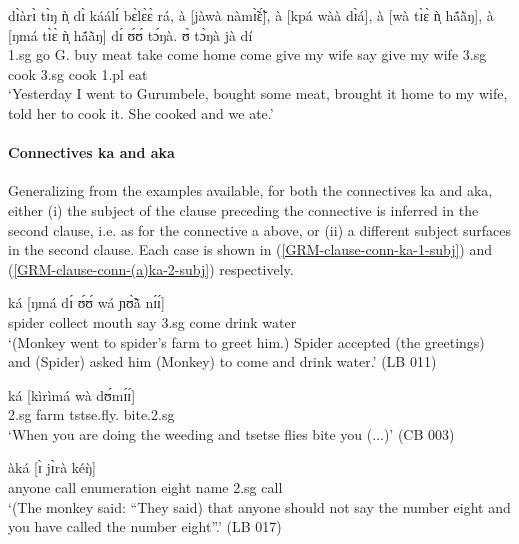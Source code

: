 \ea\label{ex:GRM-coor-vp8.1}
\gll dɪ̀àrɪ̀ tɪ̀ŋ ǹ̩ dɪ̀ káálɪ́ bɛ̀lɛ̀ɛ̀ rá, à [jàwà nàmɪ̃̀ɛ̃́], à 
[kpá wàà dɪ̀á], à  [wà tɪ̀ɛ̀ ǹ̩ hã́ã̀ŋ], à [ŋmá tɪ̀ɛ̀ ǹ̩ hã́ã̀ŋ] 
dɪ́ ʊ́ʊ́ tɔ́ŋà. ʊ̀ tɔ̀ŋà jà dí\\ 
{\advt} {\art} {\sc 1.sg} {\hest} {go} {G.}  {\foc} {\conn}   buy meat
{\conn}  take come home {\conn}  come give my wife  {\conn}  say give my wife
{\comp}  {\sc 3.sg}   {cook} {\sc 3.sg}   {cook}  {\sc 1.pl} {eat}\\
\glt  `Yesterday I went to Gurumbele,  bought some meat, brought it
home to my wife, told her to cook it. She cooked and we ate.'
\z


\paragraph{Connectives {\sls ka} and {\sls aka}}
\label{GRM-clause-coord-ka-aka}

Generalizing from the examples available, for both the connectives {\sls ka} 
and 
{\sls aka}, either (i) the subject of the clause preceding the connective is 
inferred in the second clause, i.e. as for  the connective  {\sls a} above, or 
(ii) a different subject surfaces in the second clause. Each case is shown in 
(\ref{GRM-clause-conn-ka-1-subj}) and (\ref{GRM-clause-conn-(a)ka-2-subj}) 
respectively.   


\ea\label{GRM-clause-conn-ka-1-subj} 
 ká  [ŋmá dɪ́ ʊ́ʊ́  
wá  
ɲʊ̃̀ã̀ nɪ́ɪ́]\\
spider collect mouth {\postp}  {\conn} say {\comp}  
{\sc 3.sg}  come   drink water\\
\glt  `(Monkey went to spider's farm to greet him.) Spider accepted
(the
greetings) and (Spider) asked him (Monkey) to come and drink water.'  (LB 011)
 \z



\ea\label{GRM-clause-conn-(a)ka-2-subj} 

\ea\label{GRM-clause-conn-ka-2-subj} 
\gll  [dɪ̀  ɪ̀    wáà    párà]  ká [kìrìmá  wà 
dʊ́mɪ́ɪ́]\\
{\conn} {\sc 2.sg} {\ingr}  farm {\conn} 
tstse.fly.{\pl}  {\ingr}  bite.{\sc 2.sg}\\
\glt  `When  you are doing the weeding and  tsetse flies bite
you (...)' (CB 003) 

\ex\label{GRM-clause-conn-aka-2-subj} 
 àká [ɪ̀ jɪ̀rà   kéŋ̀]\\
{\comp}   anyone     {\neg}   {\itr} {\ingr}  
   call   enumeration    
eight name   {\conn}   {\sc 2.sg}   call  {\advm}\\
\glt  `(The monkey said:  ``They said) that anyone should not say the
number eight and you have called the number eight''.' (LB
017) 

